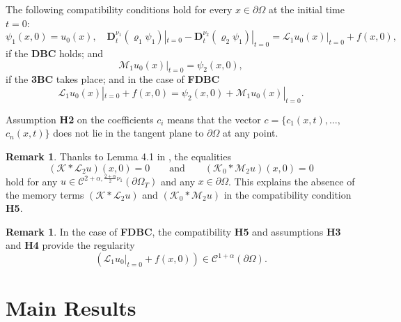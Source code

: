 \documentclass[reqno]{amsart}
\def\C {\mathcal{C}}
\theoremstyle{definition}
\newtheorem{remark}[proposition]{Remark}
\numberwithin{equation}{section}
\begin{document}
\begin{description}
    \smallskip
    \item[H5. Compatibility conditions] The following compatibility conditions hold for every
		 $x\in\partial\Omega$ at the initial time
     $t=0$:
    \begin{equation*}
\psi_1(x,0)=u_{0}(x),\quad
\mathbf{D}_{t}^{\nu_{1}}(\varrho_1\psi_1)|_{t=0}-\mathbf{D}_{t}^{\nu_2}(\varrho_2\psi_1)|_{t=0}=\mathcal{L}_{1}u_{0}(x)|_{t=0}+f(x,0),
    \end{equation*}
    if the \textbf{DBC}  holds; and
    \begin{equation*}
\mathcal{M}_{1}u_{0}(x)|_{t=0}=\psi_{2}(x,0),
    \end{equation*}
    if the \textbf{3BC}  takes place; and in the case of \textbf{FDBC}
		    \begin{equation*}
\mathcal{L}_{1}u_{0}(x)|_{t=0}+f(x,0)=\psi_{2}(x,0)+\mathcal{M}_{1}u_{0}(x)|_{t=0}.
    \end{equation*}
\end{description}

\medskip
Assumption \textbf{H2} on the coefficients $c_{i}$ means that the vector $c=\{c_{1}(x,t),...,$ $c_{n}(x,t)\}$ does not lie in the tangent plane to $\partial
\Omega$ at any point.
\begin{remark}\label{r3.1}
Thanks to Lemma 4.1 in \cite{KPV1}, the equalities
\[
(\mathcal{K}*\mathcal{L}_{2}u)(x,0)=0\qquad \text{and}
\qquad(\mathcal{K}_0*\mathcal{M}_{2}u)(x,0)=0
\]
hold for any $u\in \C^{2+\alpha,\frac{2+\alpha}{2}\nu_{1}}(\partial\Omega_{T})$ and
any $x\in\partial\Omega$. This explains the absence of the memory terms
$(\mathcal{K}*\mathcal{L}_{2}u)$ and $(\mathcal{K}_0*\mathcal{M}_{2}u)$ in the compatibility condition \textbf{H5}.
\end{remark}
\begin{remark}\label{r3.1*}
In the case of \textbf{FDBC},
the compatibility \textbf{H5}
 and assumptions \textbf{H3} and \textbf{H4} provide the  regularity
\[
(\mathcal{L}_{1}u_{0}|_{t=0}+f(x,0))\in\C^{1+\alpha}(\partial\Omega).
\]
\end{remark}



\section{Main Results}\label{s3*}
\end{document}
